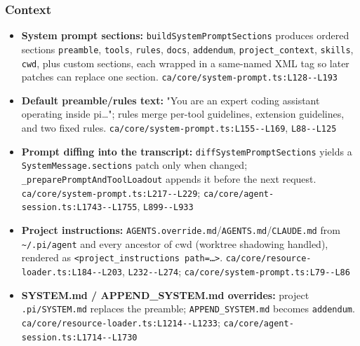 \subsubsection*{Context}
\begin{itemize}
\item \textbf{System prompt sections:} \texttt{buildSystemPromptSections} produces ordered sections \texttt{preamble}, \texttt{tools}, \texttt{rules}, \texttt{docs}, \texttt{addendum}, \texttt{project\_\allowbreak{}context}, \texttt{skills}, \texttt{cwd}, plus custom sections, each wrapped in a same-named XML tag so later patches can replace one section. \texttt{ca/\allowbreak{}core/\allowbreak{}system-\allowbreak{}prompt.\allowbreak{}ts:\allowbreak{}L128-\allowbreak{}-\allowbreak{}L193}
\item \textbf{Default preamble/rules text:} "You are an expert coding assistant operating inside pi\ldots{}"; rules merge per-tool guidelines, extension guidelines, and two fixed rules. \texttt{ca/\allowbreak{}core/\allowbreak{}system-\allowbreak{}prompt.\allowbreak{}ts:\allowbreak{}L155-\allowbreak{}-\allowbreak{}L169}, \texttt{L88-\allowbreak{}-\allowbreak{}L125}
\item \textbf{Prompt diffing into the transcript:} \texttt{diffSystemPromptSections} yields a \texttt{SystemMessage.\allowbreak{}sections} patch only when changed; \texttt{\_\allowbreak{}preparePromptAndToolLoadout} appends it before the next request. \texttt{ca/\allowbreak{}core/\allowbreak{}system-\allowbreak{}prompt.\allowbreak{}ts:\allowbreak{}L217-\allowbreak{}-\allowbreak{}L229}; \texttt{ca/\allowbreak{}core/\allowbreak{}agent-\allowbreak{}session.\allowbreak{}ts:\allowbreak{}L1743-\allowbreak{}-\allowbreak{}L1755}, \texttt{L899-\allowbreak{}-\allowbreak{}L933}
\item \textbf{Project instructions:} \texttt{AGENTS.\allowbreak{}override.\allowbreak{}md}/\texttt{AGENTS.\allowbreak{}md}/\texttt{CLAUDE.\allowbreak{}md} from \texttt{\textasciitilde{}/\allowbreak{}.\allowbreak{}pi/\allowbreak{}agent} and every ancestor of cwd (worktree shadowing handled), rendered as \texttt{<project\_\allowbreak{}instructions path=\ldots{}>}. \texttt{ca/\allowbreak{}core/\allowbreak{}resource-\allowbreak{}loader.\allowbreak{}ts:\allowbreak{}L184-\allowbreak{}-\allowbreak{}L203}, \texttt{L232-\allowbreak{}-\allowbreak{}L274}; \texttt{ca/\allowbreak{}core/\allowbreak{}system-\allowbreak{}prompt.\allowbreak{}ts:\allowbreak{}L79-\allowbreak{}-\allowbreak{}L86}
\item \textbf{SYSTEM.md / APPEND\_SYSTEM.md overrides:} project \texttt{.\allowbreak{}pi/\allowbreak{}SYSTEM.\allowbreak{}md} replaces the preamble; \texttt{APPEND\_\allowbreak{}SYSTEM.\allowbreak{}md} becomes \texttt{addendum}. \texttt{ca/\allowbreak{}core/\allowbreak{}resource-\allowbreak{}loader.\allowbreak{}ts:\allowbreak{}L1214-\allowbreak{}-\allowbreak{}L1233}; \texttt{ca/\allowbreak{}core/\allowbreak{}agent-\allowbreak{}session.\allowbreak{}ts:\allowbreak{}L1714-\allowbreak{}-\allowbreak{}L1730}

\end{itemize}

